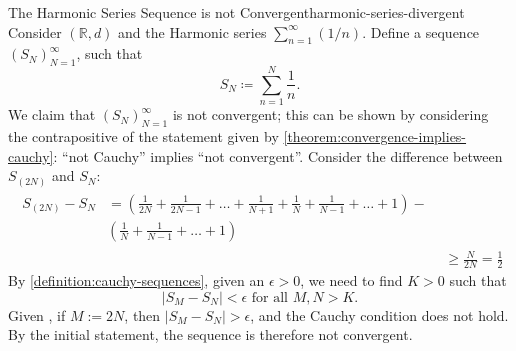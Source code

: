 \documentclass{article}
\numberwithin{equation}{section}
\numberwithin{figure}{section}
\begin{document}
\begin{example}{The Harmonic Series Sequence is not
        Convergent}{harmonic-series-divergent}
    Consider $ (\mathbb{R}, d) $ and the Harmonic series $ \sum_{n=1}^\infty
    (1/n) $. Define a sequence $ \left( S_N \right)_{N=1}^\infty $, such that
    \begin{equation}
        S_N \coloneq \sum_{n=1}^N \frac{1}{n}.
    \end{equation}
    We claim that $ \left( S_N \right)_{N=1}^\infty $ is not convergent; this
    can be shown by considering the contrapositive of the statement given by
    \cref{theorem:convergence-implies-cauchy}: ``not Cauchy'' implies ``not
    convergent''. Consider the difference between $ S_{(2N)} $ and $ S_N $:
    \begingroup
        \setlength\jot{.8em}
        \begin{align}
            \begin{split}
                S_{(2N)} - S_N &= \left( \frac{1}{2N} + \frac{1}{2N-1} + \ldots
                + \frac{1}{N+1} + \frac{1}{N} + \frac{1}{N-1} + \ldots + 1
                \right) -\\ &\left( \frac{1}{N} + \frac{1}{N-1} + \ldots + 1
                \right)
            \end{split}\label{eqn:harmonic-series-1}\\
            &\geq \frac{N}{2N} = \frac{1}{2}\label{eqn:harmonic-series-2}
        \end{align}
    \endgroup
    By \cref{definition:cauchy-sequences}, given an $ \epsilon > 0 $, we need to
    find $ K > 0 $ such that
    \begin{equation}
        \left\vert S_M - S_N \right\vert < \epsilon \text{ for all } M, N > K.
    \end{equation}
    Given , if $ M := 2N
    $, then $ \left\vert S_M - S_N \right\vert > \epsilon $, and the Cauchy
    condition does not hold. By the initial statement, the sequence is therefore
    not convergent.
\end{example}
\end{document}
